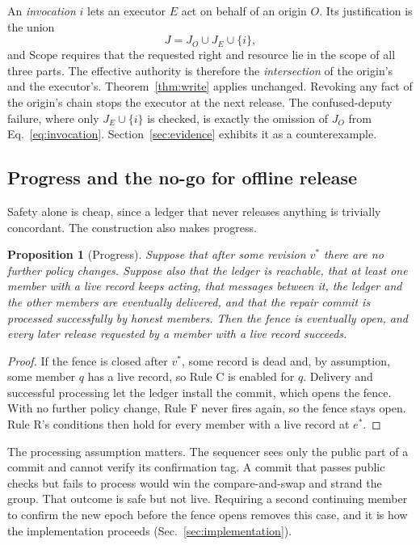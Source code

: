 \documentclass[aps,prx,reprint,superscriptaddress,nofootinbib,floatfix]{revtex4-2}
\newtheorem{proposition}{Proposition}
\theoremstyle{remark}
\newcommand{\Static}{\mathrm{Scope}}
\begin{document}
An \emph{invocation} $i$ lets an executor $E$ act on behalf of an origin $O$. Its justification is the union
\begin{equation}
J=J_O\cup J_E\cup\{i\},
\label{eq:invocation}
\end{equation}
and $\Static$ requires that the requested right and resource lie in the scope of all three parts. The effective authority is therefore the \emph{intersection} of the origin's and the executor's. Theorem~\ref{thm:write} applies unchanged. Revoking any fact of the origin's chain stops the executor at the next release. The confused-deputy failure, where only $J_E\cup\{i\}$ is checked, is exactly the omission of $J_O$ from Eq.~\eqref{eq:invocation}. Section~\ref{sec:evidence} exhibits it as a counterexample.

\subsection{Progress and the no-go for offline release}

Safety alone is cheap, since a ledger that never releases anything is trivially concordant. The construction also makes progress.

\begin{proposition}[Progress]\label{prop:progress}
Suppose that after some revision $v^\ast$ there are no further policy changes. Suppose also that the ledger is reachable, that at least one member with a live record keeps acting, that messages between it, the ledger and the other members are eventually delivered, and that the repair commit is processed successfully by honest members. Then the fence is eventually open, and every later release requested by a member with a live record succeeds.
\end{proposition}
\begin{proof}
If the fence is closed after $v^\ast$, some record is dead and, by assumption, some member $q$ has a live record, so Rule C is enabled for $q$. Delivery and successful processing let the ledger install the commit, which opens the fence. With no further policy change, Rule F never fires again, so the fence stays open. Rule R's conditions then hold for every member with a live record at $e^\ast$.
\end{proof}

The processing assumption matters. The sequencer sees only the public part of a commit and cannot verify its confirmation tag. A commit that passes public checks but fails to process would win the compare-and-swap and strand the group. That outcome is safe but not live. Requiring a second continuing member to confirm the new epoch before the fence opens removes this case, and it is how the implementation proceeds (Sec.~\ref{sec:implementation}).
\end{document}
